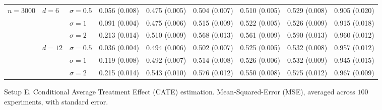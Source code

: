 \documentclass[11pt]{article} %
\theoremstyle{theorem}  %
\theoremstyle{plain}
\begin{document}
\begin{figure}[H]
\begin{tabular}{lllllllll}
\cline{1-9}
\cline{2-9}
\multirow{6}{*}{$n=3000$} & \multirow{3}{*}{$d=6$} & $\sigma=0.5$ &  0.056 (0.008) &  0.475 (0.005) &  0.504 (0.007) &  0.510 (0.005) &  0.529 (0.008) &  0.905 (0.020) \\
         &        & $\sigma=1$ &  0.091 (0.004) &  0.475 (0.006) &  0.515 (0.009) &  0.522 (0.005) &  0.526 (0.009) &  0.915 (0.018) \\
         &        & $\sigma=2$ &  0.213 (0.014) &  0.510 (0.009) &  0.568 (0.013) &  0.561 (0.009) &  0.590 (0.013) &  0.960 (0.012) \\
\cline{2-9}
         & \multirow{3}{*}{$d=12$} & $\sigma=0.5$ &  0.036 (0.004) &  0.494 (0.006) &  0.502 (0.007) &  0.525 (0.005) &  0.532 (0.008) &  0.957 (0.012) \\
         &        & $\sigma=1$ &  0.119 (0.008) &  0.492 (0.007) &  0.514 (0.008) &  0.526 (0.006) &  0.532 (0.009) &  0.945 (0.015) \\
         &        & $\sigma=2$ &  0.215 (0.014) &  0.543 (0.010) &  0.576 (0.012) &  0.550 (0.008) &  0.575 (0.012) &  0.967 (0.009) \\
\bottomrule
\end{tabular}

\caption{Setup E. Conditional Average Treatment Effect (CATE) estimation. Mean-Squared-Error (MSE), averaged across $100$ experiments, with standard error.}
\label{fig:setupE-cate}
\end{figure}
 
\end{document}
